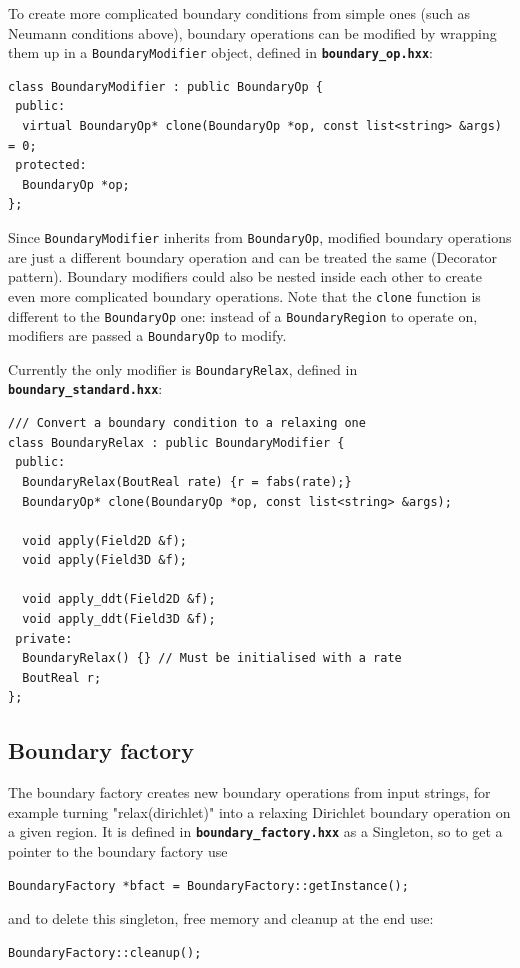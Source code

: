 \documentclass[12pt]{article}
\newcommand{\code}[1]{\texttt{#1}}
\newcommand{\file}[1]{\texttt{\bf #1}}
\begin{document}
To create more complicated boundary conditions from simple ones (such as
Neumann conditions above), boundary operations can be modified by
wrapping them up in a \code{BoundaryModifier} object, defined
in \file{boundary\_op.hxx}: 
\begin{lstlisting}[firstnumber=63]
class BoundaryModifier : public BoundaryOp {
 public:
  virtual BoundaryOp* clone(BoundaryOp *op, const list<string> &args) = 0;
 protected:
  BoundaryOp *op;
};
\end{lstlisting}
Since \code{BoundaryModifier} inherits from \code{BoundaryOp},
modified boundary operations are just a different boundary operation and can
be treated the same (Decorator pattern). Boundary modifiers could also be
nested inside each other to create even more complicated boundary operations.
Note that the \code{clone} function is different to the \code{BoundaryOp} one:
instead of a \code{BoundaryRegion} to operate on, modifiers are passed a
\code{BoundaryOp} to modify.

Currently the only modifier is \code{BoundaryRelax}, defined in
\file{boundary\_standard.hxx}: 
\begin{lstlisting}[firstnumber=64]
/// Convert a boundary condition to a relaxing one
class BoundaryRelax : public BoundaryModifier {
 public:
  BoundaryRelax(BoutReal rate) {r = fabs(rate);}
  BoundaryOp* clone(BoundaryOp *op, const list<string> &args);

  void apply(Field2D &f);
  void apply(Field3D &f);

  void apply_ddt(Field2D &f);
  void apply_ddt(Field3D &f);
 private:
  BoundaryRelax() {} // Must be initialised with a rate
  BoutReal r;
};
\end{lstlisting}

\subsection{Boundary factory}
\label{sec:BoundaryFactory}
The boundary factory creates new boundary operations from input strings,
for example turning "relax(dirichlet)" into a relaxing Dirichlet boundary
operation on a given region. It is defined in \file{boundary\_factory.hxx}
as a Singleton, so to get a pointer to the boundary factory use
\begin{lstlisting}[numbers=none]
  BoundaryFactory *bfact = BoundaryFactory::getInstance();
\end{lstlisting}
and to delete this singleton, free memory and cleanup at the end use:
\begin{lstlisting}[numbers=none]
  BoundaryFactory::cleanup();
\end{lstlisting}
\end{document}

